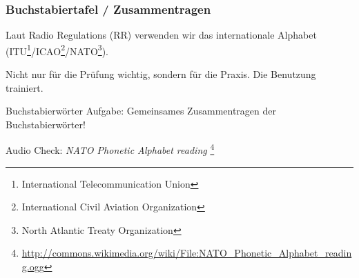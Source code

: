 \begin{frame}
    \frametitle{Buchstabiertafel / Zusammentragen}

    Laut Radio Regulations (RR) verwenden wir das internationale Alphabet
    (ITU\footnote{\tiny International Telecommunication
    Union}/ICAO\footnote{\tiny International Civil Aviation
    Organization}/NATO\footnote{\tiny North Atlantic Treaty Organization}).

    Nicht nur für die Prüfung wichtig, sondern für die Praxis. Die Benutzung
    trainiert.

    \begin{exampleblock}{Buchstabierwörter}
        Aufgabe: Gemeinsames Zusammentragen der Buchstabierwörter!
    \end{exampleblock}

    Audio Check: \emph{NATO Phonetic Alphabet reading}
    \footnote{\tiny \url{http://commons.wikimedia.org/wiki/File:NATO_Phonetic_Alphabet_reading.ogg}}

\end{frame}

